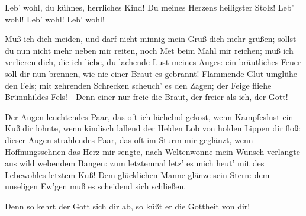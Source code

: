\begin{drama}

Leb' wohl, du kühnes, herrliches Kind!
Du meines Herzens heiligster Stolz!
Leb' wohl! Leb' wohl! Leb' wohl!
 



Muß ich dich meiden,
und darf nicht minnig
mein Gruß dich mehr grüßen;
sollst du nun nicht mehr neben mir reiten,
noch Met beim Mahl mir reichen;
muß ich verlieren dich, die ich liebe,
du lachende Lust meines Auges:
ein bräutliches Feuer soll dir nun brennen,
wie nie einer Braut es gebrannt!
Flammende Glut umglühe den Fels;
mit zehrenden Schrecken
scheuch' es den Zagen;
der Feige fliehe Brünnhildes Fels! -
Denn einer nur freie die Braut,
der freier als ich, der Gott!
 



Der Augen leuchtendes Paar,
das oft ich lächelnd gekost,
wenn Kampfeslust ein Kuß dir lohnte,
wenn kindisch lallend der Helden Lob
von holden Lippen dir floß:
 dieser Augen strahlendes Paar,
das oft im Sturm mir geglänzt,
wenn Hoffnungssehnen das Herz mir sengte,
nach Weltenwonne mein Wunsch verlangte
aus wild webendem Bangen:
zum letztenmal
letz' es mich heut'
mit des Lebewohles letztem Kuß!
Dem glücklichen Manne
glänze sein Stern:
dem unseligen Ew'gen
muß es scheidend sich schließen.
 



Denn so kehrt der Gott sich dir ab,
so küßt er die Gottheit von dir!
 




\end{drama}
